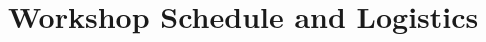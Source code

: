 \documentclass{article}
\begin{document}

\section*{Workshop Schedule and Logistics}
\end{document}
